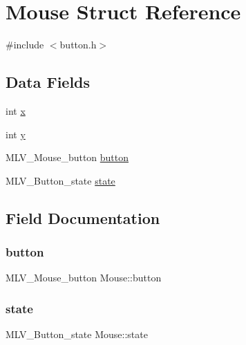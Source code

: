 \hypertarget{structMouse}{}\section{Mouse Struct Reference}
\label{structMouse}


{\ttfamily \#include $<$button.\+h$>$}

\subsection*{Data Fields}
\begin{DoxyCompactItemize}
\item 
int \hyperlink{structMouse_a136eea114b70f46392b89cc3779d4291}{x}
\item 
int \hyperlink{structMouse_a4a29b1c18faaa2fbe39ff985ba9d6737}{y}
\item 
M\+L\+V\+\_\+\+Mouse\+\_\+button \hyperlink{structMouse_a326c4f9190419c2aadac8b82c808e11f}{button}
\item 
M\+L\+V\+\_\+\+Button\+\_\+state \hyperlink{structMouse_a4e1a227cd9414b65219cbc7b42e7395d}{state}
\end{DoxyCompactItemize}


\subsection{Field Documentation}
\mbox{\label{structMouse_a326c4f9190419c2aadac8b82c808e11f}} 
\subsubsection{\texorpdfstring{button}{button}}
{\footnotesize\ttfamily M\+L\+V\+\_\+\+Mouse\+\_\+button Mouse\+::button}

\mbox{\label{structMouse_a4e1a227cd9414b65219cbc7b42e7395d}} 
\subsubsection{\texorpdfstring{state}{state}}
{\footnotesize\ttfamily M\+L\+V\+\_\+\+Button\+\_\+state Mouse\+::state}

\mbox{\label{structMouse_a136eea114b70f46392b89cc3779d4291}} 

